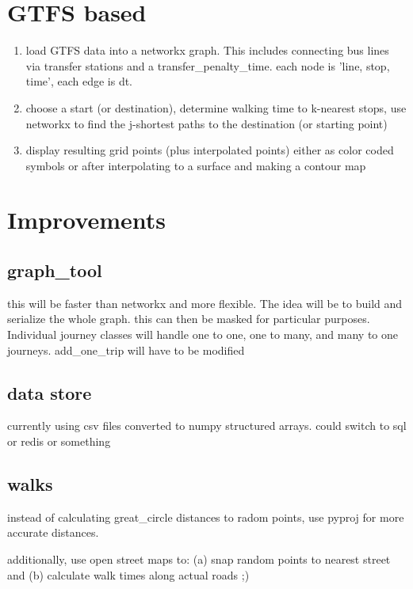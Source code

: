

\section{GTFS based}

\begin{enumerate}

\item load GTFS data into a networkx graph.  This includes connecting bus lines via transfer stations and a transfer_penalty_time.  each node is 'line, stop, time', each edge is dt.

\item choose a start (or destination), determine walking time to k-nearest stops, use networkx to find the j-shortest paths to the destination (or starting point)

\item display resulting grid points (plus interpolated points) either as color coded symbols or after interpolating to a surface and making a contour map


\end{enumerate}

\section{Improvements}

\subsection{graph_tool}
this will be faster than networkx and more flexible.  The idea will be to build and serialize the whole graph.  this can then be masked for particular purposes.  Individual journey classes will handle one to one, one to many, and many to one journeys.  add_one_trip will have to be modified

\subsection{data store}
currently using csv files converted to numpy structured arrays.  could switch to sql or redis or something

\subsection{walks}
instead of calculating great_circle distances to radom points, use pyproj for more accurate distances.

additionally, use open street maps to: (a) snap random points to nearest street and (b) calculate walk times along actual roads ;)
